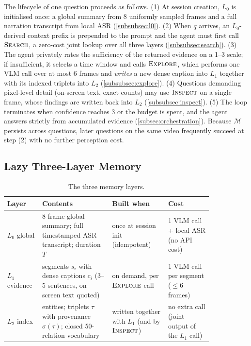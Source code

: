 The lifecycle of one question proceeds as follows. (1) At session creation, $L_0$ is initialised
once: a global summary from 8 uniformly sampled frames and a full narration transcript from local
ASR (\cref{subsubsec:l0}). (2) When $q$ arrives, an $L_0$-derived context prefix is prepended to the prompt and
the agent must first call $\textsc{Search}$, a zero-cost joint lookup over all three layers
(\cref{subsubsec:search}). (3) The agent privately rates the sufficiency of the returned evidence on a 1--3 scale;
if insufficient, it selects a time window and calls $\textsc{Explore}$, which performs one VLM
call over at most 6 frames and \emph{writes} a new dense caption into $L_1$ together with its indexed
triplets into $L_2$ (\cref{subsubsec:explore}). (4) Questions demanding pixel-level detail (on-screen text, exact
counts) may use $\textsc{Inspect}$ on a single frame, whose findings are written back into $L_2$
(\cref{subsubsec:inspect}). (5) The loop terminates when confidence reaches 3 or the budget is spent, and the agent
answers strictly from accumulated evidence (\cref{subsec:orchestration}). Because $\mathcal{M}$ persists across
questions, later questions on the same video frequently succeed at step (2) with no further
perception cost.

\subsection{Lazy Three-Layer Memory}
\label{subsec:memory}

\begin{table}[t]
  \centering
  \small
  \caption{The three memory layers.}
  \label{tab:layers}
  \begin{tabular}{@{}p{0.11\linewidth}p{0.30\linewidth}p{0.24\linewidth}p{0.19\linewidth}@{}}
    \toprule
    Layer & Contents & Built when & Cost \\
    \midrule
    $L_0$ global & 8-frame global summary; full timestamped ASR transcript; duration $T$ & once at session init (idempotent) & 1 VLM call + local ASR (no API cost) \\
    $L_1$ evidence & segments $s_i$ with dense captions $c_i$ (3--5 sentences, on-screen text quoted) & on demand, per $\textsc{Explore}$ call & 1 VLM call per segment ($\leq 6$ frames) \\
    $L_2$ index & entities; triplets $\tau$ with provenance $\sigma(\tau)$; closed 50-relation vocabulary & written together with $L_1$ (and by $\textsc{Inspect}$) & no extra call (joint output of the $L_1$ call) \\
    \bottomrule
  \end{tabular}
\end{table}

